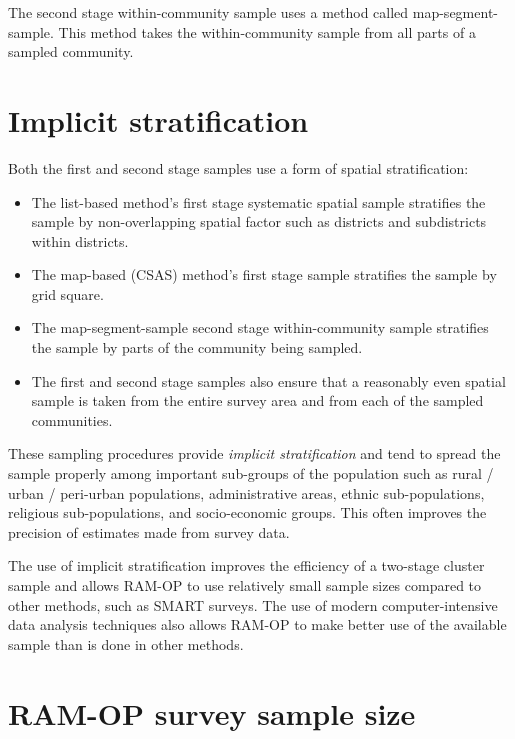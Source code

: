 \documentclass[12pt,a4paper]{book}
\begin{document}
The second stage within-community sample uses a method called map-segment-sample. This method takes the within-community sample from all parts of a sampled community.

\hypertarget{implicit-stratification}{%
\section{Implicit stratification}\label{implicit-stratification}}

Both the first and second stage samples use a form of spatial stratification:

\begin{itemize}
\item
  The list-based method's first stage systematic spatial sample stratifies the sample by non-overlapping
  spatial factor such as districts and subdistricts within districts.
\item
  The map-based (CSAS) method's first stage sample stratifies the sample by grid square.
\item
  The map-segment-sample second stage within-community sample stratifies the sample by parts of the community being sampled.
\item
  The first and second stage samples also ensure that a reasonably even spatial sample is taken from the entire survey area and from each of the sampled communities.
\end{itemize}

These sampling procedures provide \emph{implicit stratification} and tend to spread the sample properly among important sub-groups of the population such as rural / urban / peri-urban populations, administrative areas, ethnic sub-populations, religious sub-populations, and socio-economic groups. This often improves the precision of estimates made from survey data.

The use of implicit stratification improves the efficiency of a two-stage cluster sample and allows RAM-OP to use relatively small sample sizes compared to other methods, such as SMART surveys. The use of modern computer-intensive data analysis techniques also allows RAM-OP to make better use of the available sample than is done in other methods.

\newpage

\hypertarget{ram-op-survey-sample-size}{%
\section{RAM-OP survey sample size}\label{ram-op-survey-sample-size}}
\end{document}
